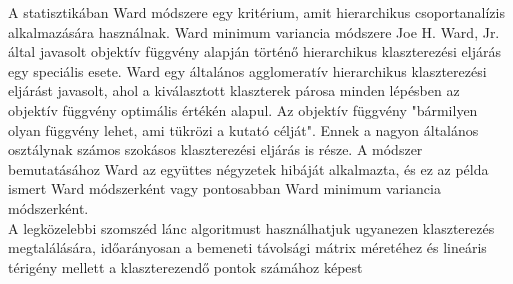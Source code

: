 \documentclass[11pt,a4paper]{article}
\begin{document}
  \begin{tcolorbox}[colback=MidnightBlue!5!white,colframe=MidnightBlue!60!black,title= Wald módszer]
    A statisztikában Ward módszere egy kritérium, amit hierarchikus csoportanalízis alkalmazására használnak. Ward minimum variancia módszere Joe H. Ward, Jr. által javasolt objektív függvény alapján történő hierarchikus klaszterezési eljárás egy speciális esete. Ward egy általános agglomeratív hierarchikus klaszterezési eljárást javasolt, ahol a kiválasztott klaszterek párosa minden lépésben az objektív függvény optimális értékén alapul. Az objektív függvény "bármilyen olyan függvény lehet, ami tükrözi a kutató célját". Ennek a nagyon általános osztálynak számos szokásos klaszterezési eljárás is része. A módszer bemutatásához Ward az együttes négyzetek hibáját alkalmazta, és ez az példa ismert Ward módszerként vagy pontosabban Ward minimum variancia módszerként.\\
    A legközelebbi szomszéd lánc algoritmust használhatjuk ugyanezen klaszterezés megtalálására, időarányosan a bemeneti távolsági mátrix méretéhez és lineáris térigény mellett a klaszterezendő pontok számához képest
  \end{tcolorbox}
\end{document}
